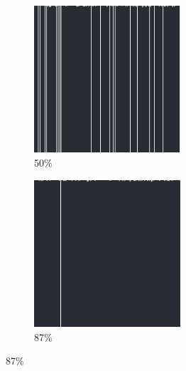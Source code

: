 \documentclass[12pt, fleqn]{report}                             %
\theoremstyle{break}                                            %
\begin{document}
\begin{figure}[ht!]
\begin{subfigure}[b]{0.4\linewidth}
          \includegraphics[width=0.6\textwidth]{Images/104/c.png}
          \caption{50\%}
        \end{subfigure}
        \begin{subfigure}[b]{0.4\linewidth}
          \includegraphics[width=0.6\textwidth]{Images/104/d.png}
          \caption{87\%}
        \end{subfigure}
      \end{figure}
\end{document}
